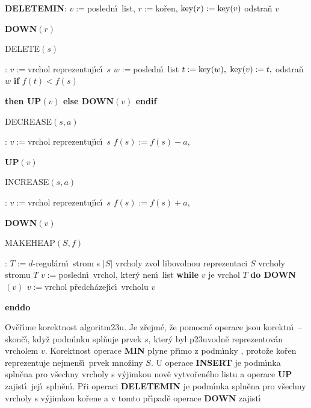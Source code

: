 {\bf DELETEMIN}:\newline 
$v:=$posledn\'\i\ list, $r:=$ko\v ren, $\operatorname{key}(r):=\operatorname{key}(v)$\newline 
odstra\v n $v$\newline 
{\bf DOWN$(r)$
\bigskip

DELETE$(s)$}:\newline 
$v:=$vrchol reprezentuj\'\i c\'\i\ $s$\newline 
$w:=$posledn\'\i\ list\newline 
$t:=\operatorname{key}(w),$ $\operatorname{key}(v):=t,$ odstra\v n $w$\newline 
{\bf if} $f(t)<f(s)$ {\bf then UP$(v)$ else DOWN$(v)$ endif
\bigskip

DECREASE$(s,a)$}:\newline 
$v:=$vrchol reprezentuj\'\i c\'\i\ $s$\newline 
$f(s):=f(s)-a$, {\bf UP$(v)$
\bigskip

INCREASE$(s,a)$}:\newline 
$v:=$vrchol reprezentuj\'\i c\'\i\ $s$\newline 
$f(s):=f(s)+a$, {\bf DOWN$(v)$
\bigskip

MAKEHEAP$(S,f)$}:\newline 
$T:=d$-regul\'arn\'\i\ strom s $|S|$ vrcholy\newline 
zvol libovolnou reprezentaci $S$ vrcholy stromu $T$\newline 
$v:=$posledn\'\i\ vrchol, kter\'y nen\'\i\ list\newline 
{\bf while} $v$ je vrchol $T$ {\bf do\newline 
\phantom{{\rm ---}}DOWN$(v)$\newline 
\phantom{{\rm ---}}$v:=$}vrchol p\v redch\'azej\'\i c\'\i\ 
vrcholu $v$\newline 
{\bf enddo
\bigskip

}\flushpar Ov\v e\v r\'\i me korektnost algoritm\accent23u.  Je z\v rejm\'e, \v ze 
pomocn\'e operace jsou korektn\'\i\ -- skon\v c\'\i , kdy\v z podm\'\i nku 
\thetag{usp} spl\v nuje prvek $s$, kter\'y byl p\accent23uvodn\v e 
reprezentov\'an vrcholem $v$. Korektnost operace {\bf MIN} plyne 
p\v r\'\i mo z podm\'\i nky , proto\v ze ko\v ren reprezentuje nejmen\v s\'\i\ 
prvek mno\v ziny $S$. U operace {\bf INSERT} je podm\'\i nka 
 spln\v ena pro v\v sechny vrcholy s v\'yjimkou nov\v e 
vytvo\v ren\'eho listu a operace {\bf UP} zajist\'\i\ jej\'\i\ spln\v en\'\i .  P\v ri 
operaci {\bf DELETEMIN} je pod\-m\'\i n\-ka \thetag{usp} spln\v ena pro 
v\v sechny vrcholy s v\'yjimkou ko\v rene a v tomto p\v r\'\i pad\v e ope\-race {\bf DOWN} zajist\'\i\ 
